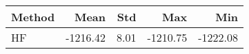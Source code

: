 \begin{tabular}{lrrrr}
\toprule
\textbf{Method} & \textbf{Mean} & \textbf{Std} & \textbf{Max} & \textbf{Min} \\
\midrule
HF & -1216.42 & 8.01 & -1210.75 & -1222.08 \\
\bottomrule
\end{tabular}
